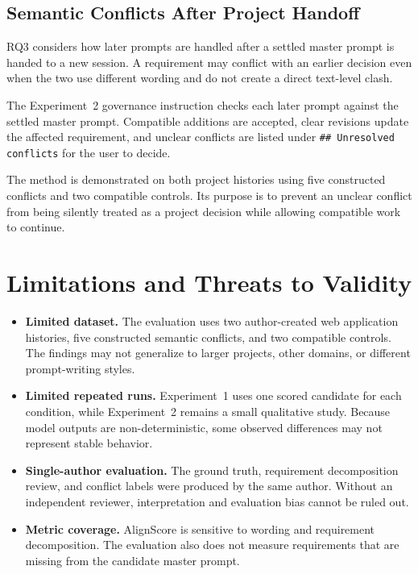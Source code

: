 \subsection{Semantic Conflicts After Project Handoff}

RQ3 considers how later prompts are handled after a settled master prompt is
handed to a new session. A requirement may conflict with an earlier decision
even when the two use different wording and do not create a direct text-level
clash.

The Experiment~2 governance instruction checks each later prompt against the
settled master prompt. Compatible additions are accepted, clear revisions
update the affected requirement, and unclear conflicts are listed under
\texttt{\#\# Unresolved conflicts} for the user to decide.

The method is demonstrated on both project histories using five constructed
conflicts and two compatible controls. Its purpose is to prevent an unclear
conflict from being silently treated as a project decision while allowing
compatible work to continue.

\section{Limitations and Threats to Validity}
\label{sec:discussion-limitations}

\begin{itemize}[leftmargin=*]

\item \textbf{Limited dataset.}
The evaluation uses two author-created web application histories, five
constructed semantic conflicts, and two compatible controls. The findings may
not generalize to larger projects, other domains, or different prompt-writing
styles.

\item \textbf{Limited repeated runs.}
Experiment~1 uses one scored candidate for each condition, while
Experiment~2 remains a small qualitative study. Because model outputs are
non-deterministic, some observed differences may not represent stable
behavior.

\item \textbf{Single-author evaluation.}
The ground truth, requirement decomposition review, and conflict labels were
produced by the same author. Without an independent reviewer, interpretation
and evaluation bias cannot be ruled out.

\item \textbf{Metric coverage.}
AlignScore is sensitive to wording and requirement decomposition. The
evaluation also does not measure requirements that are missing from the
candidate master prompt.

\end{itemize}

